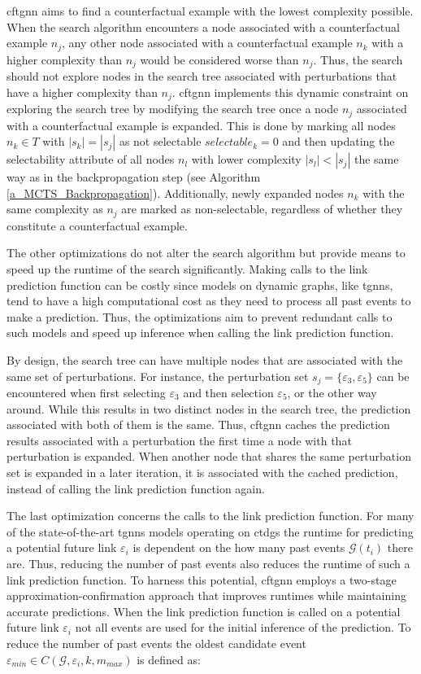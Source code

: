  \gls{cftgnn} aims to find a counterfactual example with the lowest complexity possible. When the search algorithm encounters a node associated with a counterfactual example $n_j$, any other node associated with a counterfactual example $n_k$ with a higher complexity than $n_j$ would be considered worse than $n_j$. Thus, the search should not explore nodes in the search tree associated with perturbations that have a higher complexity than $n_j$. \gls{cftgnn} implements this dynamic constraint on exploring the search tree by modifying the search tree once a node $n_j$ associated with a counterfactual example is expanded. This is done by marking all nodes $n_k \in T$ with $|s_k| = |s_j|$ as not selectable $selectable_k = 0$ and then updating the selectability attribute of all nodes $n_l$ with lower complexity $|s_l| < |s_j|$ the same way as in the backpropagation step (see Algorithm \ref{a_MCTS_Backpropagation}). Additionally, newly expanded nodes $n_k$ with the same complexity as $n_j$ are marked as non-selectable, regardless of whether they constitute a counterfactual example.

 The other optimizations do not alter the search algorithm but provide means to speed up the runtime of the search significantly. Making calls to the link prediction function can be costly since models on dynamic graphs, like \glspl{tgnn}, tend to have a high computational cost as they need to process all past events to make a prediction. Thus, the optimizations aim to prevent redundant calls to such models and speed up inference when calling the link prediction function.

By design, the search tree can have multiple nodes that are associated with the same set of perturbations. For instance, the perturbation set $s_j = \{\varepsilon_3, \varepsilon_5\}$ can be encountered when first selecting $\varepsilon_3$ and then selection $\varepsilon_5$, or the other way around. While this results in two distinct nodes in the search tree, the prediction associated with both of them is the same. Thus, \gls{cftgnn} caches the prediction results associated with a perturbation the first time a node with that perturbation is expanded. When another node that shares the same perturbation set is expanded in a later iteration, it is associated with the cached prediction, instead of calling the link prediction function again.

The last optimization concerns the calls to the link prediction function. For many of the state-of-the-art \glspl{tgnn} models operating on \glspl{ctdg} \cite{rossi_temporal_2020, souza_provably_2022} the runtime for predicting a potential future link $\varepsilon_i$ is dependent on the how many past events $\mathcal{G}(t_i)$ there are. Thus, reducing the number of past events also reduces the runtime of such a link prediction function. To harness this potential, \gls{cftgnn} employs a two-stage approximation-confirmation approach that improves runtimes while maintaining accurate predictions. When the link prediction function is called on a potential future link $\varepsilon_i$ not all events are used for the initial inference of the prediction. To reduce the number of past events the oldest candidate event $\varepsilon_{min} \in C(\mathcal{G}, \varepsilon_i, k, m_{max})$ is defined as:

